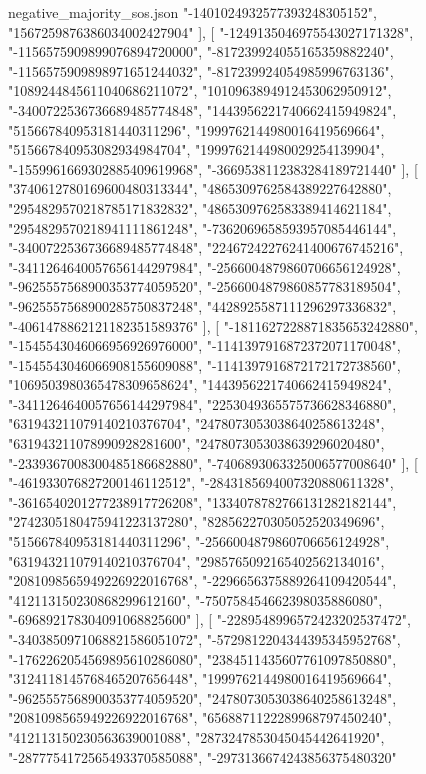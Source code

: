 \begin{filecontents*}[overwrite]{negative_majority_sos.json}
    "-1401024932577393248305152",
    "1567259876386034002427904"
   ],
   [
    "-1249135046975543027171328",
    "-1156575909899076894720000",
    "-817239924055165359882240",
    "-1156575909898971651244032",
    "-817239924054985996763136",
    "1089244845611040686211072",
    "1010963894912453062950912",
    "-3400722536736689485774848",
    "1443956221740662415949824",
    "515667840953181440311296",
    "1999762144980016419569664",
    "515667840953082934984704",
    "1999762144980029254139904",
    "-1559961669302885409619968",
    "-3669538112383284189721440"
   ],
   [
    "3740612780169600480313344",
    "4865309762584389227642880",
    "2954829570218785171832832",
    "4865309762583389414621184",
    "2954829570218941111861248",
    "-7362069658593957085446144",
    "-3400722536736689485774848",
    "22467242276241400676745216",
    "-3411264640057656144297984",
    "-2566004879860706656124928",
    "-9625557568900353774059520",
    "-2566004879860857783189504",
    "-9625557568900285750837248",
    "4428925587111296297336832",
    "-4061478862121182351589376"
   ],
   [
    "-1811627228871835653242880",
    "-1545543046066956926976000",
    "-1141397916872372071170048",
    "-1545543046066908155609088",
    "-1141397916872172172738560",
    "1069503980365478309658624",
    "1443956221740662415949824",
    "-3411264640057656144297984",
    "2253049365575736628346880",
    "631943211079140210376704",
    "2478073053038640258613248",
    "631943211078990928281600",
    "2478073053038639296020480",
    "-2339367008300485186682880",
    "-7406893063325006577008640"
   ],
   [
    "-461933076827200146112512",
    "-2843185694007320880611328",
    "-3616540201277238917726208",
    "1334078782766131282182144",
    "2742305180475941223137280",
    "828562270305052520349696",
    "515667840953181440311296",
    "-2566004879860706656124928",
    "631943211079140210376704",
    "2985765092165402562134016",
    "2081098565949226922016768",
    "-2296656375889264109420544",
    "412113150230868299612160",
    "-750758454662398035886080",
    "-696892178304091068825600"
   ],
   [
    "-2289548996572423202537472",
    "-3403850971068821586051072",
    "-5729812204344395345952768",
    "-1762262054569895610286080",
    "2384511435607761097850880",
    "3124118145768465207656448",
    "1999762144980016419569664",
    "-9625557568900353774059520",
    "2478073053038640258613248",
    "2081098565949226922016768",
    "6568871122289968797450240",
    "412113150230563639001088",
    "2873247853045045442641920",
    "-2877754172565493370585088",
    "-2973136674243856375480320"

\end{filecontents*}
